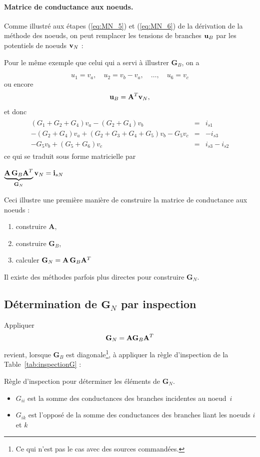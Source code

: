 \paragraph{Matrice de conductance aux noeuds.} %
Comme illustré aux étapes (\ref{eq:MN_5}) et (\ref{eq:MN_6}) de la dérivation de la méthode des noeuds, on peut remplacer les tensions de branches ${\bf u}_B$ par les potentiels de noeuds ${\bf v}_N$ :
\begin{testexample} Pour le même exemple que celui qui a servi à illustrer $\mathbf{G}_B$, on a 

$$u_1 =  v_a, \quad 
u_2 =  v_b-v_a, \quad 
\ldots, \quad 
u_6 =  v_c$$
ou encore 
$$ {\bf u}_B = {\bf A}^T {\bf v}_N, $$
et donc 
\begin{gather*}
\begin{array}{rcl}
	(G_1+G_2+G_4) v_a-(G_2+G_4)v_b& = & i_{s1}\\
	-(G_2+G_4)v_a+(G_2+G_3+G_4+G_5)v_b-G_5 v_c & = & -i_{s3}\\
	-G_5 v_b+ (G_5+G_6) v_c & = & i_{s3}-i_{s2}
\end{array} 
\end{gather*}
ce qui se traduit sous forme matricielle par
\begin{center}
	$\underbrace{{\bf A}\,{\bf G}_B {\bf A}^T}_{{\bf G}_N}{\bf v}_N = {\bf i}_{sN}$
\end{center}
\end{testexample}

Ceci illustre une première manière de construire la matrice de conductance aux noeuds : 
\begin{enumerate}
\item construire $\mathbf{A}$,
\item construire $\mathbf{G}_B$,
\item calculer $\mathbf{G}_N = {\bf A}\,{\bf G}_B {\bf A}^T$
\end{enumerate}
Il existe des méthodes parfois plus directes pour construire $\mathbf{G}_N$.

\subsection{Détermination de $\mathbf{G}_N$ par inspection}
Appliquer $${\bf G}_N= {\bf A} {\bf G}_B {\bf A}^T$$ revient, lorsque $\mathbf{G}_B$ est diagonale\footnote{Ce qui n'est pas le cas avec des sources commandées.}, à appliquer la règle d'inspection de la Table~\ref{tab:inspectionG} : 
\begin{table}
\caption{Règle d'inspection pour déterminer les éléments de $\mathbf{G}_N$.}\label{tab:inspectionG}
\begin{boxedminipage}{\textwidth}
\begin{itemize}
	\item $G_{ii}$ est la somme des conductances des branches incidentes au
	noeud~$i$
	\item $G_{ik}$ est l'opposé de la somme des
	conductances des branches liant les noeuds $i$ et $k$
\end{itemize}
\end{boxedminipage}
\end{table}

